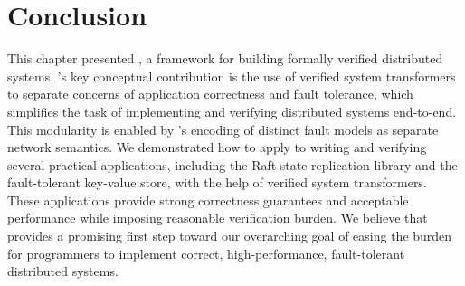 \section{Conclusion}\label{sec:verdi:conclusion}

This chapter presented \Verdi, a framework for building formally
verified distributed systems.  \Verdi's key conceptual contribution is
the use of verified system transformers to separate concerns of
application correctness and fault tolerance, which simplifies the task
of implementing and verifying distributed systems end-to-end. This
modularity is enabled by \Verdi's encoding of distinct fault models as
separate network semantics.  We demonstrated how to apply \Verdi to
writing and verifying several practical applications, including the
Raft state replication library and the \vard fault-tolerant key-value
store, with the help of verified system transformers.  These
applications provide strong correctness guarantees and acceptable
performance while imposing reasonable verification burden. We believe
that \Verdi provides a promising first step toward our overarching
goal of easing the burden for programmers to implement correct,
high-performance, fault-tolerant distributed systems.

